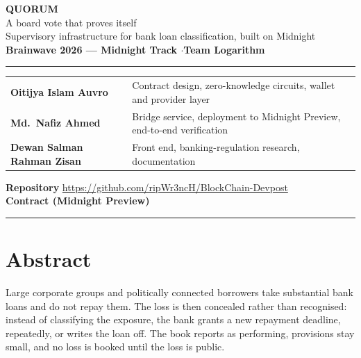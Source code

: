\documentclass[11pt,a4paper]{article}
\begin{document}
\begin{center}
  {\Huge\bfseries\color{ink} QUORUM}\\[3pt]
  {\large A board vote that proves itself}\\[6pt]
  {\normalsize Supervisory infrastructure for bank loan classification, built on Midnight}\\[10pt]
  {\small\bfseries Brainwave 2026 --- Midnight Track \quad$\cdot$\quad Team Logarithm}
\end{center}

\vspace{2pt}
{\color{rule}\hrule height 0.8pt}
\vspace{8pt}

\begin{tabularx}{\textwidth}{@{}L{0.30}L{0.70}@{}}
\textbf{Oitijya Islam Auvro} & Contract design, zero-knowledge circuits, wallet and provider layer \\
\textbf{Md.\ Nafiz Ahmed} & Bridge service, deployment to Midnight Preview, end-to-end verification \\
\textbf{Dewan Salman Rahman Zisan} & Front end, banking-regulation research, documentation \\
\end{tabularx}

\vspace{6pt}
{\small\textbf{Repository} \quad\url{https://github.com/ripWr3ncH/BlockChain-Devpost}\\
\textbf{Contract (Midnight Preview)} \quad\texttt{}}

\vspace{4pt}
{\color{rule}\hrule height 0.8pt}

\section*{Abstract}

Large corporate groups and politically connected borrowers take substantial bank loans and do not repay
them. The loss is then concealed rather than recognised: instead of classifying the exposure, the bank
grants a new repayment deadline, repeatedly, or writes the loan off. The book reports as performing,
provisions stay small, and no loss is booked until the loss is public.
\end{document}
